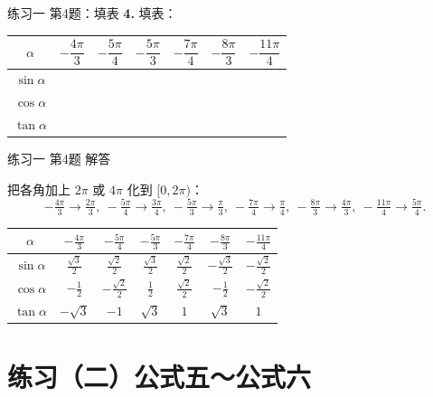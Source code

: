 \documentclass[10pt,aspectratio=169,serif]{beamer}
\begin{document}
\begin{frame}[t]{练习一 第4题：填表}
\textbf{4.} 填表：
\vspace{0.5em}
\begin{center}
\begin{tabular}{c|cccccc}
$\alpha$ & $-\dfrac{4\pi}{3}$ & $-\dfrac{5\pi}{4}$ & $-\dfrac{5\pi}{3}$ & $-\dfrac{7\pi}{4}$ & $-\dfrac{8\pi}{3}$ & $-\dfrac{11\pi}{4}$\\
\hline
$\sin\alpha$ & & & & & & \\
\hline
$\cos\alpha$ & & & & & & \\
\hline
$\tan\alpha$ & & & & & & \\
\end{tabular}
\end{center}
\end{frame}

\begin{frame}[t]{练习一 第4题 解答}
\begin{tcolorbox}[colback=orange!10,colframe=orange,title=\textbf{解}]
把各角加上 $2\pi$ 或 $4\pi$ 化到 $[0,2\pi)$：
\[
-\tfrac{4\pi}{3}\to\tfrac{2\pi}{3},\ -\tfrac{5\pi}{4}\to\tfrac{3\pi}{4},\ -\tfrac{5\pi}{3}\to\tfrac{\pi}{3},\ -\tfrac{7\pi}{4}\to\tfrac{\pi}{4},\ -\tfrac{8\pi}{3}\to\tfrac{4\pi}{3},\ -\tfrac{11\pi}{4}\to\tfrac{5\pi}{4}.
\]
\vspace{0.3em}
\small
\begin{tabular}{c|cccccc}
$\alpha$ & $-\tfrac{4\pi}{3}$ & $-\tfrac{5\pi}{4}$ & $-\tfrac{5\pi}{3}$ & $-\tfrac{7\pi}{4}$ & $-\tfrac{8\pi}{3}$ & $-\tfrac{11\pi}{4}$\\
\hline
$\sin\alpha$ & $\tfrac{\sqrt3}{2}$ & $\tfrac{\sqrt2}{2}$ & $\tfrac{\sqrt3}{2}$ & $\tfrac{\sqrt2}{2}$ & $-\tfrac{\sqrt3}{2}$ & $-\tfrac{\sqrt2}{2}$\\
\hline
$\cos\alpha$ & $-\tfrac12$ & $-\tfrac{\sqrt2}{2}$ & $\tfrac12$ & $\tfrac{\sqrt2}{2}$ & $-\tfrac12$ & $-\tfrac{\sqrt2}{2}$\\
\hline
$\tan\alpha$ & $-\sqrt3$ & $-1$ & $\sqrt3$ & $1$ & $\sqrt3$ & $1$\\
\end{tabular}
\end{tcolorbox}
\end{frame}

\section*{练习（二）公式五～公式六}
\end{document}
